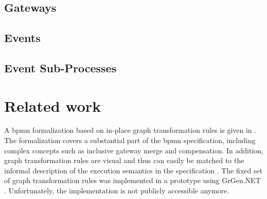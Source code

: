 \documentclass[adraft, copyright, creativecommons]{eptcs} %
\begin{document}
\subsection{Gateways}
\subsection{Events}

\subsection{Event Sub-Processes}

\section{Related work}

A \gls*{bpmn} formalization based on in-place graph transformation rules is given in \cite{vangorpVisualTokenbasedFormalization2013}.
The formalization covers a substantial part of the \gls*{bpmn} specification, including complex concepts such as inclusive gateway merge and compensation.
In addition, graph transformation rules are visual and thus can easily be matched to the informal description of the execution semantics in the specification \cite{objectmanagementgroupBusinessProcessModel2013}.
The fixed set of graph transformation rules was implemented in a prototype using GrGen.NET \cite{vangorpVisualTokenbasedFormalization2013}.
Unfortunately, the implementation is not publicly accessible anymore.
\end{document}
